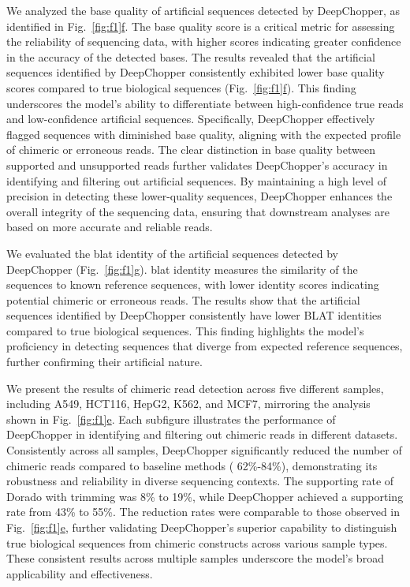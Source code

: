 \documentclass[pdflatex, sn-mathphys-num, lineno]{sn-jnl}%
\newcommand{\figref}[2]{Fig.~\hyperref[#1]{\ref*{#1}#2}}
\theoremstyle{thmstyleone}%
\theoremstyle{thmstyletwo}%
\theoremstyle{thmstylethree}%
\begin{document}
We analyzed the base quality of artificial sequences detected by DeepChopper, as identified in \figref{fig:f1}{f}.
The base quality score is a critical metric for assessing the reliability of sequencing data, with higher scores indicating greater confidence in the accuracy of the detected bases.
The results revealed that the artificial sequences identified by DeepChopper consistently exhibited lower base quality scores compared to true biological sequences (\figref{fig:f1}{f}).
This finding underscores the model's ability to differentiate between high-confidence true reads and low-confidence artificial sequences.
Specifically, DeepChopper effectively flagged sequences with diminished base quality, aligning with the expected profile of chimeric or erroneous reads.
The clear distinction in base quality between supported and unsupported reads further validates DeepChopper's accuracy in identifying and filtering out artificial sequences.
By maintaining a high level of precision in detecting these lower-quality sequences, DeepChopper enhances the overall integrity of the sequencing data, ensuring that downstream analyses are based on more accurate and reliable reads.


We evaluated the \gls{blat} identity of the artificial sequences detected by DeepChopper (\figref{fig:f1}{g}).
\gls{blat} identity measures the similarity of the sequences to known reference sequences, with lower identity scores indicating potential chimeric or erroneous reads.
The results show that the artificial sequences identified by DeepChopper consistently have lower BLAT identities compared to true biological sequences.
This finding highlights the model's proficiency in detecting sequences that diverge from expected reference sequences, further confirming their artificial nature.

We present the results of chimeric read detection across five different samples, including A549, HCT116, HepG2, K562, and MCF7, mirroring the analysis shown in \figref{fig:f1}{e}.
Each subfigure  illustrates the performance of DeepChopper in identifying and filtering out chimeric reads in different datasets.
Consistently across all samples, DeepChopper significantly reduced the number of chimeric reads compared to baseline methods ( 62\%-84\%), demonstrating its robustness and reliability in diverse sequencing contexts.
The supporting rate of Dorado with trimming was 8\% to 19\%, while DeepChopper achieved a supporting rate from 43\% to 55\%.
The reduction rates were comparable to those observed in \figref{fig:f1}{e}, further validating DeepChopper’s superior capability to distinguish true biological sequences from chimeric constructs across various sample types.
These consistent results across multiple samples underscore the model's broad applicability and effectiveness.
\end{document}
